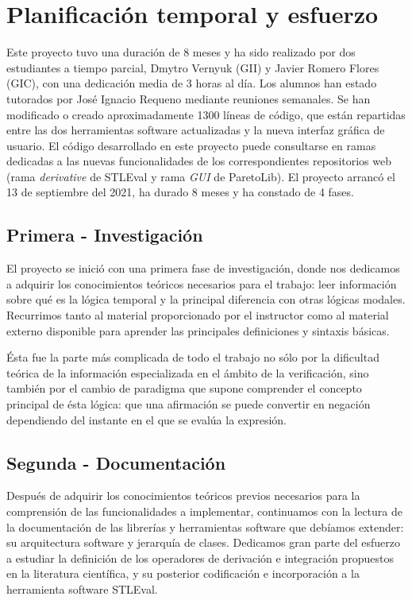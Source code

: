\section{Planificación temporal y esfuerzo}

Este proyecto tuvo una duración de 8 meses y ha sido realizado por dos estudiantes a tiempo parcial, Dmytro Vernyuk (GII) y Javier Romero Flores (GIC), con una dedicación media de 3 horas al día. Los alumnos han estado tutorados por José Ignacio Requeno mediante reuniones semanales. Se han modificado o creado aproximadamente 1300 líneas de código, que están repartidas entre las dos herramientas software actualizadas y la nueva interfaz gráfica de usuario. El código desarrollado en este proyecto puede consultarse en ramas dedicadas a las nuevas funcionalidades de los correspondientes repositorios web (rama \textit{derivative} de STLEval y rama \textit{GUI} de ParetoLib). El proyecto arrancó el 13 de septiembre del 2021, ha durado 8 meses y ha constado de 4 fases.

\subsection{Primera - Investigación}
El proyecto se inició con una primera fase de investigación, donde nos dedicamos a adquirir los conocimientos teóricos necesarios para el trabajo: leer información sobre qué es la lógica temporal y la principal diferencia con otras lógicas modales. Recurrimos tanto al material proporcionado por el instructor como al material externo disponible para aprender las principales definiciones y sintaxis básicas. 

Ésta fue la parte más complicada de todo el trabajo no sólo por la dificultad teórica de la información especializada en el ámbito de la verificación, sino también por el cambio de paradigma que supone comprender el concepto principal de ésta lógica: que una afirmación se puede convertir en negación dependiendo del instante en el que se evalúa la expresión.
	
\subsection{Segunda - Documentación}

	Después de adquirir los conocimientos teóricos previos necesarios para la comprensión de las funcionalidades a implementar, continuamos con la lectura de la documentación de las librerías y herramientas software que debíamos extender: su arquitectura software y jerarquía de clases. Dedicamos gran parte del esfuerzo a estudiar la definición de los operadores de derivación e integración propuestos en la literatura científica, y su posterior codificación e incorporación a la herramienta software STLEval.
	
